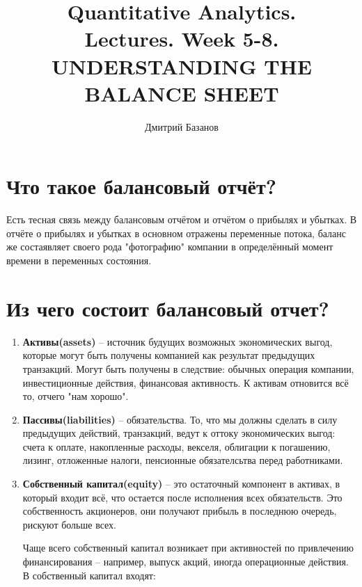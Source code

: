 \documentclass{article}
\title{Quantitative Analytics.\\
Lectures. Week 5-8. \\
UNDERSTANDING THE BALANCE SHEET}
\author{Дмитрий Базанов}
\begin{document}
\maketitle

\setcounter{tocdepth}{1} %
\renewcommand\contentsname{Contents}
\tableofcontents
\newpage



\renewcommand{\labelitemi}{\tiny$\bullet$}
\renewcommand{\figurename}{Fig.}


\section{Что такое балансовый отчёт?}
	Есть тесная связь между балансовым отчётом и отчётом о прибылях и убытках. В отчёте о прибылях и убытках в основном отражены переменные потока, баланс же состаявляет своего рода "фотографию" компании в определённый момент времени в переменных состояния. 
   
\section{ Из чего состоит балансовый отчет? }
\begin{enumerate}
\item \textbf{Активы(assets)} -- источник будущих возможных экономических выгод, которые могут быть получены компанией как результат предыдущих транзакций. Могут быть получены в следствие: обычных операция компании, инвестиционные действия, финансовая активность. К активам отновится всё то, отчего "нам хорошо".

\item \textbf{Пассивы(liabilities)} -- обязательства. То, что мы должны сделать в силу предыдущих действий, транзакций, ведут к оттоку экономических выгод: счета к оплате, накопленные расходы, векселя, облигации к погашению, лизинг, отложенные налоги, пенсионные обязателсьтва перед работниками. 

\item \textbf{Собственный капитал(equity)} -- это остаточный компонент в активах, в который входит всё, что остается после исполнения всех обязательств. Это собственность акционеров, они получают прибыль в последнюю очередь, рискуют больше всех.

Чаще всего собственный капитал возникает при активностей по привлечению финансирования – например, выпуск акций, иногда операционные действия. 
В собственный капитал входят:
\end{enumerate}
    
\end{document}

